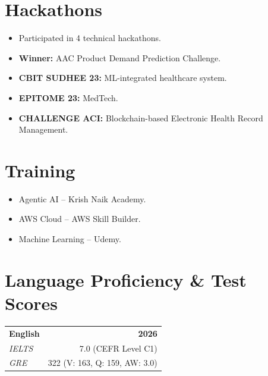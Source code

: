 \documentclass[a4paper,11pt]{article}
\begin{document}
\section{Hackathons}

\begin{itemize}[nosep, leftmargin=1.2em, itemsep=3pt, topsep=1pt, label=\textbullet]
  \item Participated in 4 technical hackathons.
  \item \textbf{Winner:} AAC Product Demand Prediction Challenge.
  \item \textbf{CBIT SUDHEE 23:} ML-integrated healthcare system.
  \item \textbf{EPITOME 23:} MedTech.
  \item \textbf{CHALLENGE ACI:} Blockchain-based Electronic Health Record Management.
\end{itemize}


\section{Training}

\begin{itemize}[nosep, leftmargin=1.2em, itemsep=2pt, topsep=1pt, label=\textbullet]
  \item Agentic AI -- Krish Naik Academy.
  \item AWS Cloud -- AWS Skill Builder.
  \item Machine Learning -- Udemy.
\end{itemize}

\section{Language Proficiency \& Test Scores}

\begin{tabularx}{\linewidth}{@{}X r@{}}
  \textbf{English} & \textbf{2026} \\
  \textit{\color{lightgray}IELTS} & \small\color{lightgray}7.0 (CEFR Level C1) \\
  \textit{\color{lightgray}GRE} & \small\color{lightgray}322 (V: 163, Q: 159, AW: 3.0) \\
\end{tabularx}
\end{document}
